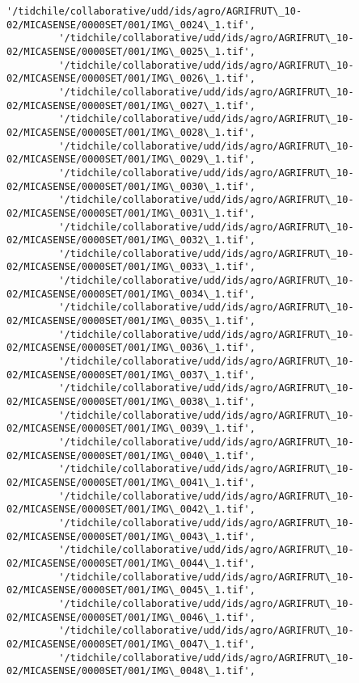 \documentclass[11pt]{article}
\begin{document}
\begin{Verbatim}[commandchars=\\\{\}]
         '/tidchile/collaborative/udd/ids/agro/AGRIFRUT\_10-02/MICASENSE/0000SET/001/IMG\_0024\_1.tif',
         '/tidchile/collaborative/udd/ids/agro/AGRIFRUT\_10-02/MICASENSE/0000SET/001/IMG\_0025\_1.tif',
         '/tidchile/collaborative/udd/ids/agro/AGRIFRUT\_10-02/MICASENSE/0000SET/001/IMG\_0026\_1.tif',
         '/tidchile/collaborative/udd/ids/agro/AGRIFRUT\_10-02/MICASENSE/0000SET/001/IMG\_0027\_1.tif',
         '/tidchile/collaborative/udd/ids/agro/AGRIFRUT\_10-02/MICASENSE/0000SET/001/IMG\_0028\_1.tif',
         '/tidchile/collaborative/udd/ids/agro/AGRIFRUT\_10-02/MICASENSE/0000SET/001/IMG\_0029\_1.tif',
         '/tidchile/collaborative/udd/ids/agro/AGRIFRUT\_10-02/MICASENSE/0000SET/001/IMG\_0030\_1.tif',
         '/tidchile/collaborative/udd/ids/agro/AGRIFRUT\_10-02/MICASENSE/0000SET/001/IMG\_0031\_1.tif',
         '/tidchile/collaborative/udd/ids/agro/AGRIFRUT\_10-02/MICASENSE/0000SET/001/IMG\_0032\_1.tif',
         '/tidchile/collaborative/udd/ids/agro/AGRIFRUT\_10-02/MICASENSE/0000SET/001/IMG\_0033\_1.tif',
         '/tidchile/collaborative/udd/ids/agro/AGRIFRUT\_10-02/MICASENSE/0000SET/001/IMG\_0034\_1.tif',
         '/tidchile/collaborative/udd/ids/agro/AGRIFRUT\_10-02/MICASENSE/0000SET/001/IMG\_0035\_1.tif',
         '/tidchile/collaborative/udd/ids/agro/AGRIFRUT\_10-02/MICASENSE/0000SET/001/IMG\_0036\_1.tif',
         '/tidchile/collaborative/udd/ids/agro/AGRIFRUT\_10-02/MICASENSE/0000SET/001/IMG\_0037\_1.tif',
         '/tidchile/collaborative/udd/ids/agro/AGRIFRUT\_10-02/MICASENSE/0000SET/001/IMG\_0038\_1.tif',
         '/tidchile/collaborative/udd/ids/agro/AGRIFRUT\_10-02/MICASENSE/0000SET/001/IMG\_0039\_1.tif',
         '/tidchile/collaborative/udd/ids/agro/AGRIFRUT\_10-02/MICASENSE/0000SET/001/IMG\_0040\_1.tif',
         '/tidchile/collaborative/udd/ids/agro/AGRIFRUT\_10-02/MICASENSE/0000SET/001/IMG\_0041\_1.tif',
         '/tidchile/collaborative/udd/ids/agro/AGRIFRUT\_10-02/MICASENSE/0000SET/001/IMG\_0042\_1.tif',
         '/tidchile/collaborative/udd/ids/agro/AGRIFRUT\_10-02/MICASENSE/0000SET/001/IMG\_0043\_1.tif',
         '/tidchile/collaborative/udd/ids/agro/AGRIFRUT\_10-02/MICASENSE/0000SET/001/IMG\_0044\_1.tif',
         '/tidchile/collaborative/udd/ids/agro/AGRIFRUT\_10-02/MICASENSE/0000SET/001/IMG\_0045\_1.tif',
         '/tidchile/collaborative/udd/ids/agro/AGRIFRUT\_10-02/MICASENSE/0000SET/001/IMG\_0046\_1.tif',
         '/tidchile/collaborative/udd/ids/agro/AGRIFRUT\_10-02/MICASENSE/0000SET/001/IMG\_0047\_1.tif',
         '/tidchile/collaborative/udd/ids/agro/AGRIFRUT\_10-02/MICASENSE/0000SET/001/IMG\_0048\_1.tif',

\end{Verbatim}
\end{document}
